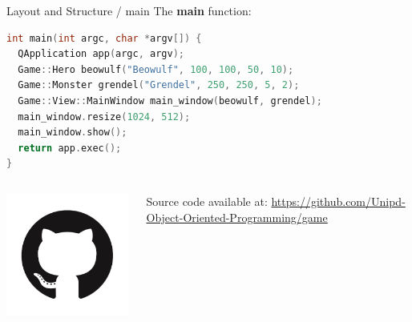 \documentclass[11pt]{beamer}
\renewcommand{\emph}[1]{\textbf{#1}}
\begin{document}
\begin{frame}[fragile]{Layout and Structure / main}
 The \emph{main} function:
 \begin{lstlisting}[language=C++]
int main(int argc, char *argv[]) {
  QApplication app(argc, argv);
  Game::Hero beowulf("Beowulf", 100, 100, 50, 10);
  Game::Monster grendel("Grendel", 250, 250, 5, 2);
  Game::View::MainWindow main_window(beowulf, grendel);
  main_window.resize(1024, 512);
  main_window.show();
  return app.exec();
}
\end{lstlisting}

 \begin{columns}
  \begin{column}{0.15\textwidth}
   \includegraphics[width=0.99\textwidth]{assets/logo-github}
  \end{column}
  \begin{column}{0.85\textwidth}
   Source code available at:
   \url{https://github.com/Unipd-Object-Oriented-Programming/game}
  \end{column}
 \end{columns}
\end{frame}
\end{document}
